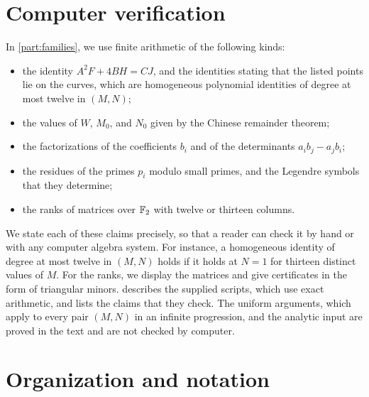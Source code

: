 \section{Computer verification}\label{sec:intro-verification}

In \cref{part:families}, we use finite arithmetic of the following kinds:
\begin{itemize}
\item the identity $A^2F+4BH=CJ$, and the identities stating that the listed points lie on the curves, which are homogeneous polynomial identities of degree at most twelve in $(M,N)$;
\item the values of $W$, $M_0$, and $N_0$ given by the Chinese remainder theorem;
\item the factorizations of the coefficients $b_i$ and of the determinants $a_ib_j-a_jb_i$;
\item the residues of the primes $p_i$ modulo small primes, and the Legendre symbols that they determine;
\item the ranks of matrices over $\mathbb F_2$ with twelve or thirteen columns.
\end{itemize}
We state each of these claims precisely, so that a reader can check it by hand or with any computer algebra system. For instance, a homogeneous identity of degree at most twelve in $(M,N)$ holds if it holds at $N=1$ for thirteen distinct values of $M$. For the ranks, we display the matrices and give certificates in the form of triangular minors.  describes the supplied scripts, which use exact arithmetic, and lists the claims that they check. The uniform arguments, which apply to every pair $(M,N)$ in an infinite progression, and the analytic input are proved in the text and are not checked by computer.

\section{Organization and notation}\label{sec:intro-organization}

